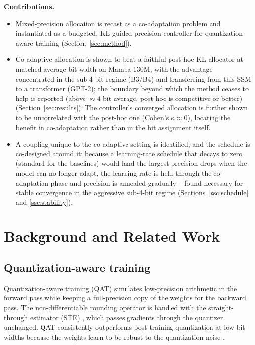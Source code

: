 \documentclass[conference]{IEEEtran}
\begin{document}
\noindent\textbf{Contributions.}
\begin{itemize}
\item Mixed-precision allocation is recast as a co-adaptation problem and
instantiated as a budgeted, KL-guided precision controller for
quantization-aware training (Section~\ref{sec:method}).
\item Co-adaptive allocation is shown to beat a faithful post-hoc KL allocator at
matched average bit-width on Mamba-130M, with the advantage concentrated in the
sub-4-bit regime (B3/B4) and transferring from this SSM to a transformer (GPT-2);
the boundary beyond which the method ceases to help is reported (above $\approx$4-bit
average, post-hoc is competitive or better) (Section~\ref{sec:results}). The controller's converged
allocation is further shown to be uncorrelated with the post-hoc one (Cohen's \(\kappa\!\approx\!0\)),
locating the benefit in co-adaptation rather than in the bit assignment itself.
\item A coupling unique to the co-adaptive setting is identified, and the schedule is co-designed
around it: because a learning-rate schedule that decays to zero (standard for the
baselines) would land the largest precision drops when the model can no longer
adapt, the learning rate is held through the co-adaptation phase and
precision is annealed gradually -- found necessary for stable convergence in the
aggressive sub-4-bit regime (Sections~\ref{ssc:schedule} and \ref{ssc:stability}).
\end{itemize}

\section{Background and Related Work}
\subsection{Quantization-aware training}
Quantization-aware training (QAT) simulates low-precision arithmetic in the
forward pass while keeping a full-precision copy of the weights for the backward
pass. The non-differentiable rounding operator is handled with the
straight-through estimator (STE) \cite{ste}, which passes gradients through the
quantizer unchanged. QAT consistently outperforms post-training quantization at
low bit-widths because the weights learn to be robust to the quantization noise
\cite{jacob,lsq}.
\end{document}
